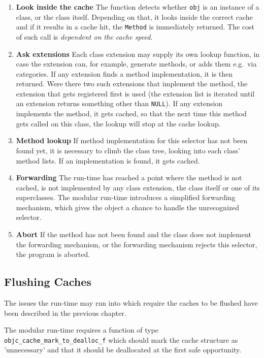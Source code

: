 \begin{enumerate}
  \item{\bf{Look inside the cache}} The function detects whether \verb=obj= is an instance of a class, or the class itself. Depending on that, it looks inside the correct cache and if it results in a cache hit, the \verb=Method= is immediately returned. The cost of such call is \emph{dependent on the cache speed}.
  \item{\bf{Ask extensions}} Each class extension may supply its own lookup function, in case the extension can, for example, generate methods, or adds them e.g.\ via categories. If any extension finds a method implementation, it is then returned. Were there two such extensions that implement the method, the extension that gets registered first is used (the extension list is iterated until an extension returns something other than \verb=NULL=). If any extension implements the method, it gets cached, so that the next time this method gets called on this class, the lookup will stop at the cache lookup.
  \item{\bf{Method lookup}} If method implementation for this selector has not been found yet, it is necessary to climb the class tree, looking into each class' method lists. If an implementation is found, it gets cached.
  \item{\bf{Forwarding}} The run-time has reached a point where the method is not cached, is not implemented by any class extension, the class itself or one of its superclasses. The modular run-time introduces a simplified forwarding mechanism, which gives the object a chance to handle the unrecognized selector.
  \item{\bf{Abort}} If the method has not been found and the class does not implement the forwarding mechanism, or the forwarding mechanism rejects this selector, the program is aborted.
\end{enumerate}

\subsection{Flushing Caches}

The issues the run-time may run into which require the caches to be flushed have been described in the previous chapter.

The modular run-time requires a function of type \newline{}\verb=objc_cache_mark_to_dealloc_f= which should mark the cache structure as 'unnecessary' and that it should be deallocated at the first safe opportunity.


